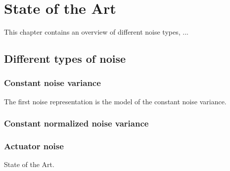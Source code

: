 \documentclass[../Masterthesis.tex]{subfiles}
\begin{document}
\chapter{State of the Art}
\label{chap:sota}

This chapter contains an overview of different noise types, ...

\section{Different types of noise}

\subsection{Constant noise variance}
The first noise representation is the model of the constant noise variance. 

\subsection{Constant normalized noise variance}

\subsection{Actuator noise}


State of the Art.
\end{document}
